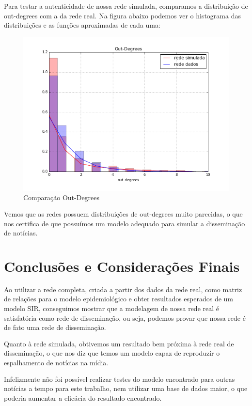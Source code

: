\documentclass[a4paper,12pt]{article}
\begin{document}
Para testar a autenticidade de nossa rede simulada, comparamos a distribuição de out-degrees com a da rede real. Na figura abaixo podemos ver
o histograma das distribuições e as funções aproximadas de cada uma:

\begin{figure}[ht]
 \centering
 \includegraphics[scale=0.6]{../Notebook/teste.png}
 \caption{Comparação Out-Degrees}
\end{figure}

Vemos que as redes possuem distribuições de out-degrees muito parecidas, o que nos certifica de que possuímos um modelo adequado para
simular a disseminação de notícias.


\pagebreak
\section{Conclusões e Considerações Finais}


Ao utilizar a rede completa, criada a partir dos dados da rede real, como matriz de relações para o modelo epidemiológico e obter
resultados esperados de um modelo SIR, conseguimos mostrar que a modelagem de nossa rede real é satisfatória como rede de disseminação, ou seja,
podemos provar que nossa rede é de fato uma rede de disseminação.

Quanto à rede simulada, obtivemos um resultado bem próxima à rede real de disseminação, o que nos diz que temos um modelo capaz de 
reproduzir o espalhamento de notícias na mídia.

Infelizmente não foi possível realizar testes do modelo encontrado para outras notícias a tempo para este trabalho, nem utilizar uma base
de dados maior, o que poderia aumentar a eficácia do resultado encontrado.
\end{document}
